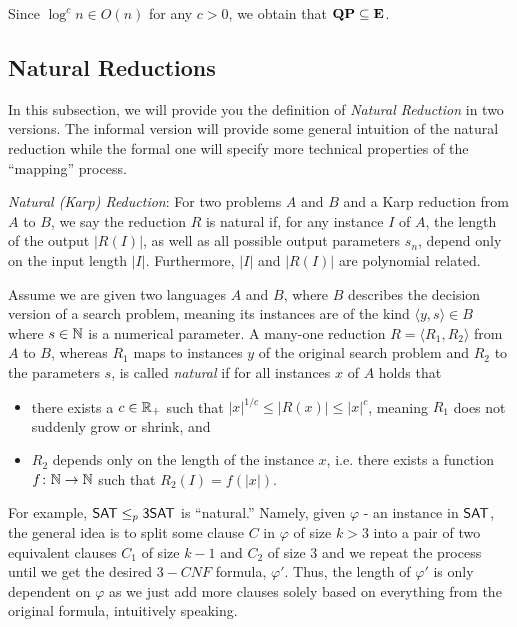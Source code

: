 \documentclass[11pt]{article}
\begin{document}
Since $\log^c n \in O(n)$ for any $c > 0$, we obtain that
$\mathbf{QP} \subseteq \mathbf{E}$.


\subsection{Natural Reductions}

In this subsection, we will provide you the definition of \textit{Natural Reduction} in two versions.
The informal version will provide some general intuition of the natural reduction while the formal one will specify more technical properties of the ``mapping'' process.  

\begin{definition}
	\textit{Natural (Karp) Reduction}: For two problems $A$ and $B$ and a Karp reduction from $A$ to $B$, we say the reduction $R$ is natural if, for any instance $I$ of $A$, the length of the output $|R(I)|$, as well as all possible output parameters $s_n$, depend only on the input length $|I|$. Furthermore, $|I|$ and $|R(I)|$ are polynomial related.
\end{definition}

\begin{definition}
  Assume we are given two languages $A$ and $B$, where $B$ describes the
  decision version of a search problem, meaning its instances are of the kind
  $\langle y, s \rangle \in B$ where $s \in {\mathbb{N}}$ is a numerical parameter.
  A many-one reduction $R = \langle R_1, R_2 \rangle$ from $A$ to $B$, whereas
  $R_1$ maps to instances $y$ of the original search problem and $R_2$ to the
  parameters $s$, is called \emph{natural} if for all instances $x$ of $A$ holds
  that
  \begin{itemize}
    \item there exists a $c \in {\mathbb R}_+$ such that
      $|x|^{1/c} \le |R(x)| \le |x|^c$, meaning $R_1$ does not suddenly grow or
      shrink, and
    \item $R_2$ depends only on the length of the instance $x$, i.e. there
      exists a function $f \colon {\mathbb{N}} \to {\mathbb{N}}$ such that $R_2(I) = f(|x|)$.
  \end{itemize}
\end{definition}
	
	For example, $\mathsf{SAT} \leq_p \mathsf{3SAT}$ is ``natural.'' Namely, given $\varphi$ - an instance in $\mathsf{SAT}$, the general idea is to split some clause $C$ in $\varphi$ of size $k > 3$ into a pair of two equivalent clauses $C_1$ of size $k - 1$ and $C_2$ of size $3$ and we repeat the process until we get the desired $3-CNF$ formula, $\varphi'$. Thus, the length of $\varphi'$ is only dependent on $\varphi$ as we just add more clauses solely based on everything from the original formula, intuitively speaking.
	
\end{document}

